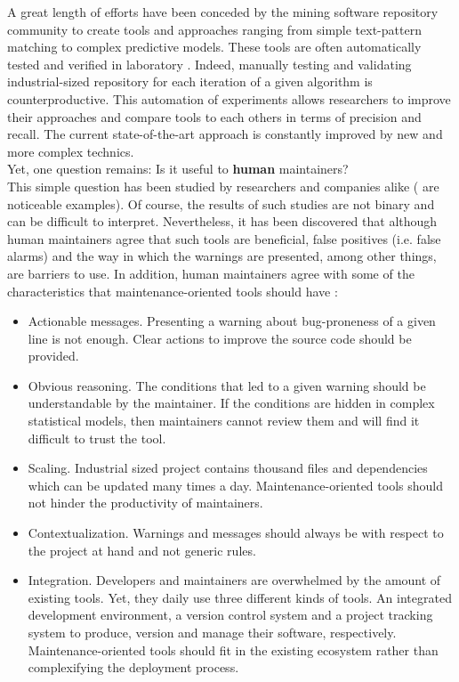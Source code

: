 A great length of efforts have been conceded by the mining software repository community to create tools and approaches ranging from simple text-pattern matching to complex predictive models.
These tools are often automatically tested and verified in laboratory \cite{Lewis2013}.
Indeed, manually testing and validating industrial-sized repository for each iteration of a given algorithm is counterproductive.
This automation of experiments allows researchers to improve their approaches and compare tools to each others in terms of precision and recall.
The current state-of-the-art approach is constantly improved by new and more complex technics\cite{Hovemeyer2004}.
\\
Yet, one question remains:  Is it useful to {\bf human} maintainers?
\\
This simple question has been studied by researchers and companies alike (\cite{Lewis2013,Foss2015,Layman2007,Ayewah2007,Ayewah2008,Johnson2013,Norman2013, Lopez2011} are noticeable examples).
Of course, the results of such studies are not binary and can be difficult to interpret.
Nevertheless, it has been discovered that although human maintainers agree that such tools are beneficial, false positives (i.e. false alarms) and the way in which the warnings are presented, among other things, are barriers to use\cite{Johnson2013}.
In addition, human maintainers agree with some of the characteristics that maintenance-oriented tools should have \cite{Hovemeyer2004, Lopez2011, Lewis2013}:

\begin{itemize}
	\item Actionable messages. Presenting a warning about bug-proneness of a given line is not enough.
	Clear actions to improve the source code should be provided.
	\item Obvious reasoning. The conditions that led to a given warning should be understandable by the maintainer.
	If the conditions are hidden in complex statistical models, then maintainers cannot review them and will find it difficult to trust the tool.
	\item Scaling. Industrial sized project contains thousand files and dependencies which can be updated many times a day.
	Maintenance-oriented tools should not hinder the productivity of maintainers.
	\item Contextualization. Warnings and messages should always be  with respect to the project at hand and not generic rules.
	\item Integration. Developers and maintainers are overwhelmed by the amount of existing tools.
	Yet, they daily use three different kinds of tools.
	An integrated development environment, a version control system and a project tracking system to produce, version and manage their software, respectively.
	Maintenance-oriented tools should fit in the existing ecosystem rather than complexifying the deployment process.
\end{itemize}

